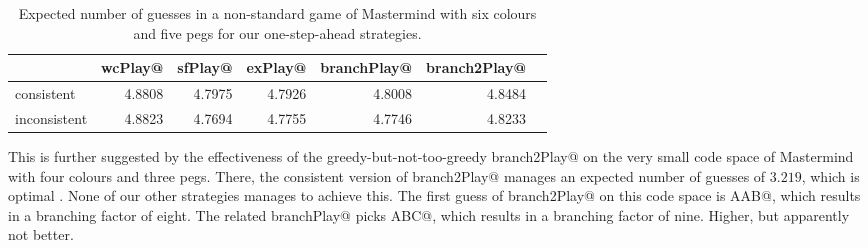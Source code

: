 \documentclass[a4paper]{article}
\makeatletter
\theoremstyle{definition}
\newcommand{\cmd}[1]{\Verb@#1@}
\newcommand{\ignore}[1]{}  %
\makeatother
\begin{document}
\ignore{
GHCi> let n = 5; mm = mastermind ['A' .. 'F'] n

GHCi> summary (strategy1 [] wcPlay) mm 
fromList [(1,1),(2,19),(3,227),(4,1724),(5,4504),(6,1290),(7,11)]

GHCi> summary (strategy1 [] sfPlay) mm 
fromList [(1,1),(2,19),(3,238),(4,1966),(5,4636),(6,904),(7,12)]

GHCi> summary (strategy1 [] exPlay) mm 
fromList [(1,1),(2,19),(3,238),(4,1924),(5,4749),(6,842),(7,3)]

GHCi> summary (strategy1 [] branchPlay) mm 
fromList [(1,1),(2,19),(3,241),(4,1991),(5,4558),(6,947),(7,19)]

GHCi> summary (strategy1 [] (branch2Play (n, 0))) mm 
fromList [(1,1),(2,19),(3,234),(4,1824),(5,4545),(6,1132),(7,21)]

GHCi> summary (strategy1 mm wcPlay) mm 
fromList [(1,1),(2,4),(3,100),(4,1618),(5,5134),(6,919)]

GHCi> summary (strategy1 mm sfPlay) mm 
fromList [(1,1),(2,11),(3,118),(4,2025),(5,5118),(6,501),(7,2)]

GHCi> summary (strategy1 mm exPlay) mm 
fromList [(1,1),(2,10),(3,120),(4,1930),(5,5257),(6,458)]

GHCi> summary (strategy1 mm branchPlay) mm 
fromList [(1,1),(2,14),(3,151),(4,2032),(5,4957),(6,615),(7,6)]

GHCi> summary (strategy1 mm (branch2Play (n, 0))) mm 
fromList [(1,1),(2,16),(3,170),(4,1898),(5,4788),(6,890),(7,13)]
}
\begin{table}
\centering
\begin{tabular}{l|rrrrrr}
	& \cmd{wcPlay}	& \cmd{sfPlay}	& \cmd{exPlay}	& \cmd{branchPlay}	& \cmd{branch2Play} \\
\hline
consistent	& 4.8808	& 4.7975	& 4.7926	& 4.8008	& 4.8484 \\
inconsistent	& 4.8823	& 4.7694	& 4.7755	& 4.7746	& 4.8233
\end{tabular}
\caption{Expected number of guesses in a non-standard game of Mastermind with six colours and five pegs for our one-step-ahead strategies.}
\label{tab:average65}
\end{table}

This is further suggested by the effectiveness of the greedy-but-not-too-greedy \cmd{branch2Play} on the very small code space of Mastermind with four colours and three pegs.
There, the consistent version of \cmd{branch2Play} manages an expected number of guesses of $3.219$, which is optimal \citep{Ville2013:aoms}.
None of our other strategies manages to achieve this.
The first guess of \cmd{branch2Play} on this code space is \cmd{AAB}, which results in a branching factor of eight.
The related \cmd{branchPlay} picks \cmd{ABC}, which results in a branching factor of nine.
Higher, but apparently not better.



\end{document}
